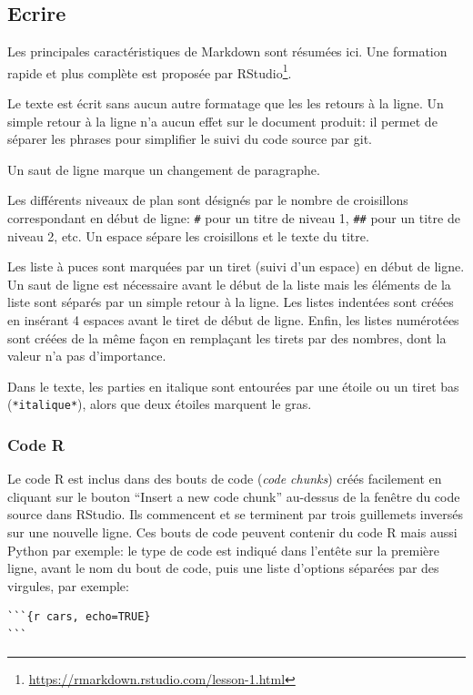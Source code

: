 \documentclass[
  12pt,
  french,
  a4paper,
  extrafontsizes,onecolumn,openright
  ]{memoir}
\begin{document}
\subsection{Ecrire}\label{ecrire}

Les principales caractéristiques de Markdown sont résumées ici.
Une formation rapide et plus complète est proposée par RStudio\footnote{\url{https://rmarkdown.rstudio.com/lesson-1.html}}.

Le texte est écrit sans aucun autre formatage que les les retours à la ligne.
Un simple retour à la ligne n'a aucun effet sur le document produit: il permet de séparer les phrases pour simplifier le suivi du code source par git.

Un saut de ligne marque un changement de paragraphe.

Les différents niveaux de plan sont désignés par le nombre de croisillons correspondant en début de ligne: \texttt{\#} pour un titre de niveau 1, \texttt{\#\#} pour un titre de niveau 2, etc.
Un espace sépare les croisillons et le texte du titre.

Les liste à puces sont marquées par un tiret (suivi d'un espace) en début de ligne.
Un saut de ligne est nécessaire avant le début de la liste mais les éléments de la liste sont séparés par un simple retour à la ligne.
Les listes indentées sont créées en insérant 4 espaces avant le tiret de début de ligne.
Enfin, les listes numérotées sont créées de la même façon en remplaçant les tirets par des nombres, dont la valeur n'a pas d'importance.

Dans le texte, les parties en italique sont entourées par une étoile ou un tiret bas (\texttt{*italique*}), alors que deux étoiles marquent le gras.

\subsubsection{Code R}\label{code-r}

Le code R est inclus dans des bouts de code (\emph{code chunks}) créés facilement en cliquant sur le bouton \enquote{Insert a new code chunk} au-dessus de la fenêtre du code source dans RStudio.
Ils commencent et se terminent par trois guillemets inversés sur une nouvelle ligne.
Ces bouts de code peuvent contenir du code R mais aussi Python par exemple: le type de code est indiqué dans l'entête sur la première ligne, avant le nom du bout de code, puis une liste d'options séparées par des virgules, par exemple:

\begin{verbatim}
```{r cars, echo=TRUE}
```
\end{verbatim}
\end{document}
